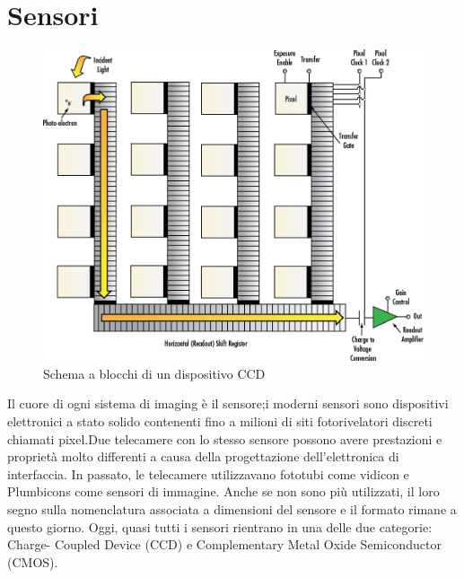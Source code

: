 

\section{Sensori}


\begin{figure}[!ht]
\centering

\includegraphics[width=\textwidth]{img/ccd-blockdiagram.jpeg}

\caption{Schema a blocchi di un dispositivo CCD}
\label{fig:ccd-blockdiagram}
\end{figure}

Il cuore di ogni sistema di imaging è il sensore;i moderni sensori sono
dispositivi elettronici a stato solido contenenti fino a milioni di siti
fotorivelatori discreti chiamati pixel.Due telecamere con lo stesso sensore
possono avere prestazioni e proprietà molto differenti a causa della
progettazione dell'elettronica di interfaccia. In passato, le telecamere
utilizzavano fototubi come vidicon e Plumbicons come sensori di immagine.
Anche se non sono più utilizzati, il loro segno sulla nomenclatura associata a
dimensioni del sensore e il formato rimane a questo giorno. Oggi, quasi tutti
i sensori rientrano in una delle due categorie: Charge- Coupled Device (CCD) e
Complementary Metal Oxide Semiconductor (CMOS).

